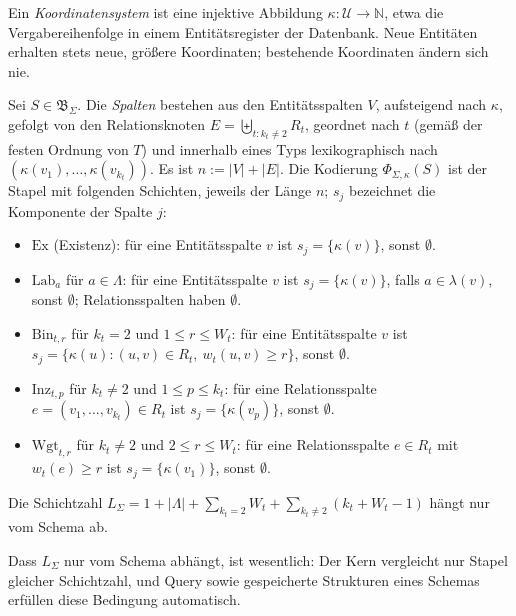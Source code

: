 \begin{definition}[Koordinatensystem]
	Ein \emph{Koordinatensystem} ist eine injektive Abbildung $\kappa:\mathcal{U}\to\mathbb{N}$, etwa die Vergabereihenfolge in einem Entitätsregister der Datenbank. Neue Entitäten erhalten stets neue, größere Koordinaten; bestehende Koordinaten ändern sich nie.
\end{definition}

\begin{definition}
	\label{def:univ_kodierung}
	Sei $S\in\mathfrak{B}_\Sigma$. Die \emph{Spalten} bestehen aus den Entitätsspalten $V$, aufsteigend nach $\kappa$, gefolgt von den Relationsknoten $E=\biguplus_{t:k_t\ne 2}R_t$, geordnet nach $t$ (gemäß der festen Ordnung von $T$) und innerhalb eines Typs lexikographisch nach $(\kappa(v_1),\dots,\kappa(v_{k_t}))$. Es ist $n:=|V|+|E|$. Die Kodierung $\Phi_{\Sigma,\kappa}(S)$ ist der Stapel mit folgenden Schichten, jeweils der Länge $n$; $s_j$ bezeichnet die Komponente der Spalte $j$:
	\begin{itemize}
	\item $\mathrm{Ex}$ (Existenz): für eine Entitätsspalte $v$ ist $s_j=\{\kappa(v)\}$, sonst $\emptyset$.
	\item $\mathrm{Lab}_a$ für $a\in\Lambda$: für eine Entitätsspalte $v$ ist $s_j=\{\kappa(v)\}$, falls $a\in\lambda(v)$, sonst $\emptyset$; Relationsspalten haben $\emptyset$.
	\item $\mathrm{Bin}_{t,r}$ für $k_t=2$ und $1\le r\le W_t$: für eine Entitätsspalte $v$ ist $s_j=\{\kappa(u) : (u,v)\in R_t,\ w_t(u,v)\ge r\}$, sonst $\emptyset$.
	\item $\mathrm{Inz}_{t,p}$ für $k_t\ne2$ und $1\le p\le k_t$: für eine Relationsspalte $e=(v_1,\dots,v_{k_t})\in R_t$ ist $s_j=\{\kappa(v_p)\}$, sonst $\emptyset$.
	\item $\mathrm{Wgt}_{t,r}$ für $k_t\ne2$ und $2\le r\le W_t$: für eine Relationsspalte $e\in R_t$ mit $w_t(e)\ge r$ ist $s_j=\{\kappa(v_1)\}$, sonst $\emptyset$.
	\end{itemize}
	Die Schichtzahl $L_\Sigma=1+|\Lambda|+\sum_{k_t=2}W_t+\sum_{k_t\ne2}(k_t+W_t-1)$ hängt nur vom Schema ab.
\end{definition}

Dass $L_\Sigma$ nur vom Schema abhängt, ist wesentlich: Der Kern vergleicht nur Stapel gleicher Schichtzahl, und Query sowie gespeicherte Strukturen eines Schemas erfüllen diese Bedingung automatisch.

